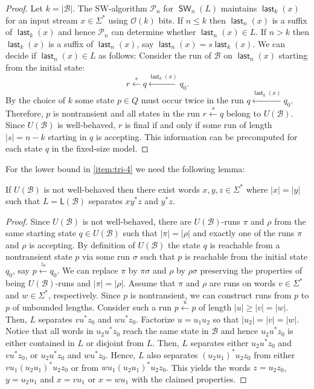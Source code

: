 \documentclass{article}\usepackage[a4paper,margin=20mm]{geometry}
\newcommand{\B}{\mathcal{B}}
\renewcommand{\O}{\mathcal{O}}
\renewcommand{\P}{\mathcal{P}}
\renewcommand{\L}{\mathsf{L}}
\DeclareMathOperator{\last}{\mathsf{last}}
\DeclareMathOperator{\SW}{\mathsf{SW}}
\renewcommand{\geq}{\geqslant}
\renewcommand{\leq}{\leqslant}
\renewcommand{\ge}{\geq}
\begin{document}
\begin{proof}
	Let $k = |\B|$.
	The SW-algorithm $\P_n$ for $\SW_n(L)$ maintains $\last_{k}(x)$ for an input stream $x \in \Sigma^*$
	using $\O(k)$ bits.
	If $n \leq k$ then $\last_n(x)$ is a suffix of $\last_{k}(x)$ and hence $\P_n$ can determine
	whether $\last_n(x) \in L$.
	If $n > k$ then $\last_{k}(x)$ is a suffix of $\last_n(x)$,
	say $\last_n(x) = s  \last_{k}(x)$.
	We can decide if $\last_n(x) \in L$ as follows:
	Consider the run of $\B$ on $\last_n(x)$ starting from the initial state:
	\[ r \xleftarrow{s} q \xleftarrow{\last_{k}(x)} q_0 . \]
	By the choice of $k$ some state $p \in Q$ must occur twice in the run $q \xleftarrow{\last_{k}(x)} q_0$.
	Therefore, $p$ is nontransient and all states in the run $r \xleftarrow{s} q$ belong to $U(\B)$.
	Since $U(\B)$ is well-behaved, $r$ is final
	if and only if some run of length $|s| = n - k$ starting in $q$ is accepting.
	This information can be precomputed for each state $q$ in the fixed-size model.
\end{proof}
For the lower bound in \ref{item:tri-4} we need the following lemma:
\begin{lemma}
	\label{lem:nonwb-loop}
	If $U(\B)$ is not well-behaved
	then there exist words $x, y, z \in \Sigma^*$
	where $|x| = |y|$ such that
	$L = \L(\B)$ separates $xy^*z$ and $y^*z$.
\end{lemma}

\begin{proof}
	Since $U(\B)$ is not well-behaved, there are $U(\B)$-runs $\pi$ and $\rho$
	from the same starting state $q \in U(\B)$ such that $|\pi| = |\rho|$
	and exactly one of the runs $\pi$ and $\rho$ is accepting.
	By definition of $U(\B)$ the state $q$ is reachable from a nontransient state $p$ via some run $\sigma$
	such that $p$ is reachable from the initial state $q_0$, say $p \xleftarrow{z_0} q_0$.
	We can replace $\pi$ by $\pi \sigma$ and $\rho$ by $\rho \sigma$
	preserving the properties of being $U(\B)$-runs and $|\pi| = |\rho|$.
	Assume that $\pi$ and $\rho$ are runs on words $v \in \Sigma^*$ and $w \in \Sigma^*$, respectively.
	Since $p$ is nontransient,
	we can construct runs from $p$ to $p$ of unbounded lengths.
	Consider such a run $p \xleftarrow{u} p$ of length $|u| \ge |v| = |w|$.
	Then, $L$ separates $v u^* z_0$ and $w u^* z_0$.
	Factorize $u = u_1 u_2$ so that $|u_2| = |v| = |w|$.
	Notice that all words in $u_2 u^*z_0$ reach the same state in $\B$
	and hence $u_2 u^*z_0$ is either contained in $L$ or disjoint from $L$.
	Then, $L$ separates either $u_2 u^* z_0$ and $v u^* z_0$,
	or $u_2 u^* z_0$ and $w u^* z_0$.
	Hence, $L$ also separates $(u_2 u_1)^*  u_2 z_0$ from either $v u_1 (u_2 u_1)^*  u_2 z_0$ or from $w u_1 (u_2 u_1)^*  u_2 z_0$.
	This yields the words $z= u_2 z_0$, $y=u_2 u_1$ and $x=v u_1$ or $x=w u_1$ with the claimed properties.
\end{proof}
\end{document}
